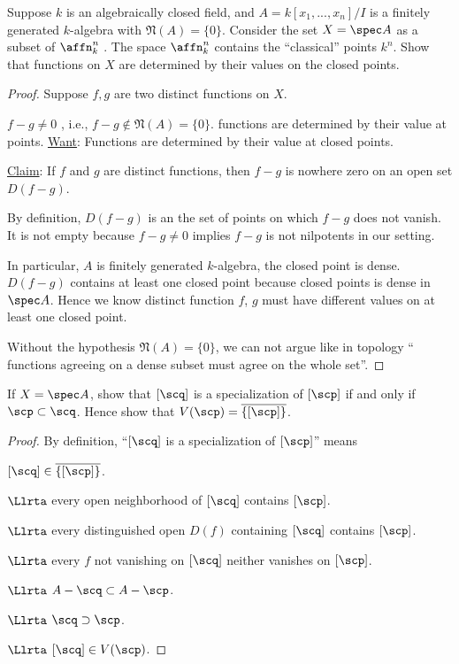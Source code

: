 \begin{exr}
Suppose $k$ is an algebraically closed field, and $A=k[x_1,...,x_n]/I$ is a finitely generated $k$-algebra with $\mathfrak{N}(A) = \{0\}$. Consider the set $X = \spec A$ as a subset of $\affn^n_k$ . The space $\affn^n_k$ contains the “classical” points $k^n$. Show that functions on $X$ are determined by their values on the closed points.
\end{exr}
\begin{proof}
Suppose $f,g$ are two distinct functions on $X$.

$f-g\neq 0$ , i.e., $f-g\notin \mathfrak{N}(A)=\{0\}$. functions are determined by their value at points. \underline{Want}: Functions are determined by their value at closed points.

\underline{Claim}: If $f$ and $g$ are distinct functions, then $f-g$ is nowhere zero on an open set $D(f-g)$.

By definition, $D(f-g)$ is an the set of points on which $f-g$ does not vanish. It is not empty because $f-g\neq 0$ implies $f-g$ is not nilpotents in our setting. 

In particular, $A$ is finitely generated $k$-algebra, the closed point is dense. $D(f-g)$ contains at least one closed point because closed points is dense in $\spec A$. Hence we know distinct function $f$, $g$ must have different values on at least one closed point.

Without the hypothesis $\mathfrak{N}(A)=\{0\}$, we can not argue like in topology `` functions agreeing on a dense subset must agree on the whole set''.
\end{proof}

\begin{exr}
If $ X = \spec A$, show that $[\scq]$ is a specialization of $[\scp]$ if and only if $\scp \subset \scq$. Hence show that $V(\scp) = \overline{\{[\scp]\}}$.
\end{exr}
\begin{proof}
By definition, ``$[\scq]$ is a specialization of $[\scp]$'' means

 $[\scq]\in\overline{\{[\scp]\}}$.

$\Llrta$ every open neighborhood of $[\scq]$ contains $[\scp]$.

$\Llrta$ every distinguished open $D(f)$ containing $[\scq]$ contains $[\scp]$.

$\Llrta$ every $f$ not vanishing on $[\scq]$ neither vanishes on $[\scp]$.

$\Llrta$ $A-\scq\subset A-\scp$.

$\Llrta$ $\scq\supset \scp$.

$\Llrta$ $[\scq]\in V(\scp)$.
\end{proof}

